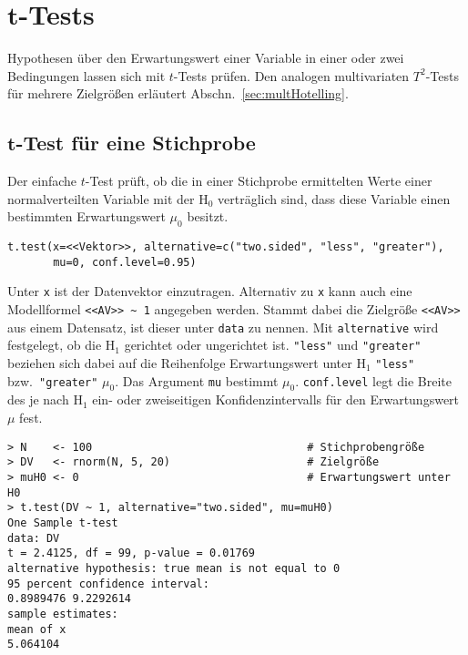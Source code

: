\section[\texorpdfstring{$t$}{t}-Tests]{$\bm{t}$-Tests}
\label{sec:tTest}

Hypothesen über den Erwartungswert einer Variable in einer oder zwei Bedingungen lassen sich mit $t$-Tests prüfen. Den analogen multivariaten $T^{2}$-Tests für mehrere Zielgrößen erläutert Abschn.\ \ref{sec:multHotelling}.

\subsection[\texorpdfstring{$t$}{t}-Test für eine Stichprobe]{$\bm{t}$-Test für eine Stichprobe}
\label{sec:tOne}

Der einfache $t$-Test prüft, ob die in einer Stichprobe ermittelten Werte einer normalverteilten Variable mit der $\text{H}_{0}$ verträglich sind, dass diese Variable einen bestimmten Erwartungswert $\mu_{0}$ besitzt.
\begin{lstlisting}
t.test(x=<<Vektor>>, alternative=c("two.sided", "less", "greater"),
       mu=0, conf.level=0.95)
\end{lstlisting}

Unter \lstinline!x! ist der Datenvektor einzutragen. Alternativ zu \lstinline!x! kann auch eine Modellformel \lstinline!<<AV>> ~ 1! angegeben werden. Stammt dabei die Zielgröße \lstinline!<<AV>>! aus einem Datensatz, ist dieser unter \lstinline!data! zu nennen. Mit \lstinline!alternative! wird festgelegt, ob die $\text{H}_{1}$ gerichtet oder ungerichtet ist. \lstinline!"less"! und \lstinline!"greater"! beziehen sich dabei auf die Reihenfolge Erwartungswert unter $\text{H}_{1}$ \lstinline!"less"! bzw.\ \lstinline!"greater"! $\mu_{0}$. Das Argument \lstinline!mu! bestimmt $\mu_{0}$. \lstinline!conf.level! legt die Breite des je nach $\text{H}_{1}$ ein- oder zweiseitigen Konfidenzintervalls für den Erwartungswert $\mu$ fest.
\begin{lstlisting}
> N    <- 100                                 # Stichprobengröße
> DV   <- rnorm(N, 5, 20)                     # Zielgröße
> muH0 <- 0                                   # Erwartungswert unter H0
> t.test(DV ~ 1, alternative="two.sided", mu=muH0)
One Sample t-test
data: DV
t = 2.4125, df = 99, p-value = 0.01769
alternative hypothesis: true mean is not equal to 0
95 percent confidence interval:
0.8989476 9.2292614
sample estimates:
mean of x
5.064104
\end{lstlisting}

